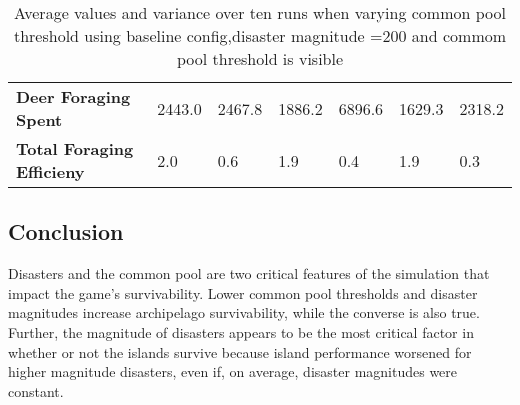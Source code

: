 \begin{center}
\begin{table}[h]
\begin{tabular}{l|ll|ll|ll}
\textbf{Deer Foraging Spent}         & 2443.0                             & 2467.8                                & 1886.2                             & 6896.6                                & 1629.3                             & 2318.2                                \\
\textbf{Total Foraging Efficieny}    & 2.0                                & 0.6                                   & 1.9                                & 0.4                                   & 1.9                                & 0.3                                  
\end{tabular}
\caption{Average values and variance over ten runs when varying common pool threshold using baseline config,disaster magnitude =200 and commom pool threshold is visible}
\label{tab:16_results_and_eval:Disasters:Common_pool}
\end{table}
\end{center}

\subsection{Conclusion}
Disasters and the common pool are two critical features of the simulation that impact the game's survivability. Lower common pool thresholds and disaster magnitudes increase archipelago survivability, while the converse is also true. Further, the magnitude of disasters appears to be the most critical factor in whether or not the islands survive because island performance worsened for higher magnitude disasters, even if, on average, disaster magnitudes were constant.
